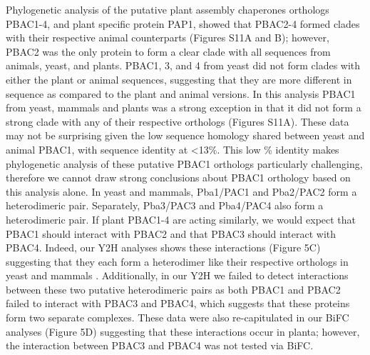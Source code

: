 Phylogenetic analysis of the putative plant assembly chaperones orthologs PBAC1-4, and plant specific protein PAP1, showed that PBAC2-4 formed clades with their respective animal counterparts (Figures S11A and B); however, PBAC2 was the only protein to form a clear clade with all sequences from animals, yeast, and plants. PBAC1, 3, and 4 from yeast did not form clades with either the plant or animal sequences, suggesting that they are more different in sequence as compared to the plant and animal versions. In this analysis PBAC1 from yeast, mammals and plants was a strong exception in that it did not form a strong clade with any of their respective orthologs (Figures S11A). These data may not be surprising given the low sequence homology shared between yeast and animal PBAC1, with sequence identity at <13\%. This low \% identity makes phylogenetic analysis of these putative PBAC1 orthologs particularly challenging, therefore we cannot draw strong conclusions about PBAC1 orthology based on this analysis alone. 
In yeast and mammals, Pba1/PAC1 and Pba2/PAC2 form a heterodimeric pair. Separately, Pba3/PAC3 and Pba4/PAC4 also form a heterodimeric pair. If plant PBAC1-4 are acting similarly, we would expect that PBAC1 should interact with PBAC2 and that PBAC3 should interact with PBAC4.  Indeed, our Y2H analyses shows these interactions (Figure 5C) suggesting that they each form a heterodimer like their respective orthologs in yeast and mammals \citep{kunjappu14}. Additionally, in our Y2H we failed to detect interactions between these two putative heterodimeric pairs as both PBAC1 and PBAC2 failed to interact with PBAC3 and PBAC4, which suggests that these proteins form two separate complexes. These data were also re-capitulated in our BiFC analyses (Figure 5D) suggesting that these interactions occur in planta; however, the interaction between PBAC3 and PBAC4 was not tested via BiFC.


